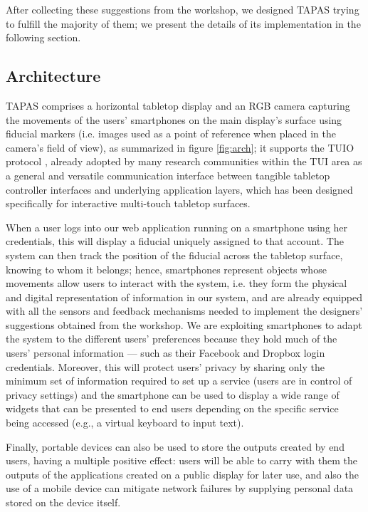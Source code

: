 After collecting these suggestions from the workshop, we designed \ac{TAPAS} trying to fulfill the majority of them; we present the details of its implementation in the following section.

\subsection{Architecture}
\acs{TAPAS} comprises a horizontal tabletop display and an RGB camera capturing the movements of the users' smartphones on the main display's surface using fiducial markers \cite{chilitags} (i.e. images used as a point of reference when placed in the camera's field of view), as summarized in figure \ref{fig:arch}; it supports the \ac{TUIO} protocol \cite{kaltenbrunner2005tuio}, already adopted by many research communities within the \ac{TUI} area as a general and versatile communication interface between tangible tabletop controller interfaces and underlying application layers, which has been designed specifically for interactive multi-touch tabletop surfaces.

When a user logs into our web application running on a smartphone using her credentials, this will display a fiducial uniquely assigned to that account. The system can then track the position of the fiducial across the tabletop surface, knowing to whom it belongs; hence, smartphones represent objects whose movements allow users to interact with the system, i.e. they form the physical and digital representation of information in our system, and are already equipped with all the sensors and feedback mechanisms needed to implement the designers' suggestions obtained from the workshop. We are exploiting smartphones to adapt the system to the different users' preferences because they hold much of the users' personal information --- such as their Facebook and Dropbox login credentials. Moreover, this will protect users' privacy by sharing only the minimum set of information required to set up a service (users are in control of privacy settings) and the smartphone can be used to display a wide range of widgets that can be presented to end users depending on the specific service being accessed (e.g., a virtual keyboard to input text).

Finally, portable devices can also be used to store the outputs created by end users, having a multiple positive effect: users will be able to carry with them the outputs of the applications created on a public display for later use, and also the use of a mobile device can mitigate network failures by supplying personal data stored on the device itself.

